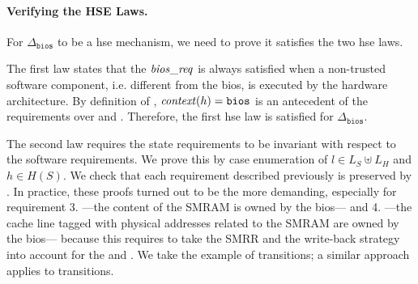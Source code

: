 \paragraph{Verifying the HSE Laws.}
%
For $\Delta_{\mathtt{bios}}$ to be a \ac{hse} mechanism, we need to prove it
satisfies the two \ac{hse} laws.

The first law states that the \( \mathit{bios\_req} \) is always satisfied when a
non-trusted software component, i.e. different from the \ac{bios}, is executed
by the hardware architecture.
%
By definition of , \( \mathit{context}(h) = \mathtt{bios} \) is an
antecedent of the requirements over  and
.
%
Therefore, the first \ac{hse} law is satisfied for \( \Delta_{\mathtt{bios}} \).

The second law requires the state requirements to be invariant with respect to
the software requirements.
%
We prove this by case enumeration of \( l \in L_S \uplus L_H \) and
\( h \in H(S) \). We check that each requirement described previously is
preserved by .
%
In practice, these proofs turned out to be the more demanding, especially for
requirement 3. ---the content of the SMRAM is owned by the \ac{bios}--- and
4. ---the cache line tagged with physical addresses related to the SMRAM are
owned by the \ac{bios}--- because this requires to take the SMRR and the
write-back strategy into account for the  and .
%
We take the example of  transitions; a similar approach applies to
 transitions.

